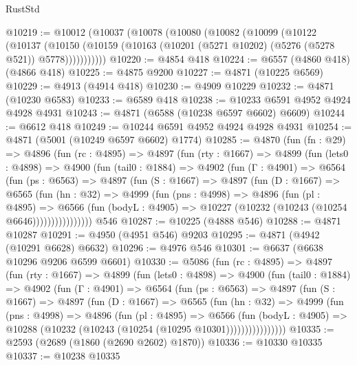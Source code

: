 \begin{lexlean}{RustStd}
\begin{coremodule}
@10219 := @10012
    (@10037
      (@10078
        (@10080
          (@10082
            (@10099
              (@10122
                (@10137
                  (@10150
                    (@10159 (@10163 (@10201 (@5271 @10202) (@5276 (@5278 @521)) @5778)))))))))))
@10220 := @4854 @418
@10224 := @6557 (@4860 @418) (@4866 @418)
@10225 := @4875 @9200
@10227 := @4871 (@10225 @6569)
@10229 := @4913 (@4914 @418)
@10230 := @4909 @10229
@10232 := @4871 (@10230 @6583)
@10233 := @6589 @418
@10238 := @10233 @6591 @4952 @4924 @4928 @4931
@10243 := @4871 (@6588 (@10238 @6597 @6602) @6609)
@10244 := @6612 @418
@10249 := @10244 @6591 @4952 @4924 @4928 @4931
@10254 := @4871 (@5001 (@10249 @6597 @6602) @1774)
@10285 := @4870
    (fun (fn : @29) =>
    @4896
      (fun (rc : @4895) =>
      @4897
        (fun (rty : @1667) =>
        @4899
          (fun (lets0 : @4898) =>
          @4900
            (fun (tail0 : @1884) =>
            @4902
              (fun (Γ : @4901) =>
              @6564
                (fun (ps : @6563) =>
                @4897
                  (fun (S : @1667) =>
                  @4897
                    (fun (D : @1667) =>
                    @6565
                      (fun (hn : @32) =>
                      @4999
                        (fun (pns : @4998) =>
                        @4896
                          (fun (pl : @4895) =>
                          @6566
                            (fun (bodyL : @4905) =>
                            @10227 (@10232 (@10243 (@10254 @6646))))))))))))))))
    @546
@10287 := @10225 (@4888 @546)
@10288 := @4871 @10287
@10291 := @4950 (@4951 @546) @9203
@10295 := @4871 (@4942 (@10291 @6628) @6632)
@10296 := @4976 @546
@10301 := @6637 (@6638 @10296 @9206 @6599 @6601)
@10330 := @5086
    (fun (rc : @4895) =>
    @4897
      (fun (rty : @1667) =>
      @4899
        (fun (lets0 : @4898) =>
        @4900
          (fun (tail0 : @1884) =>
          @4902
            (fun (Γ : @4901) =>
            @6564
              (fun (ps : @6563) =>
              @4897
                (fun (S : @1667) =>
                @4897
                  (fun (D : @1667) =>
                  @6565
                    (fun (hn : @32) =>
                    @4999
                      (fun (pns : @4998) =>
                      @4896
                        (fun (pl : @4895) =>
                        @6566
                          (fun (bodyL : @4905) =>
                          @10288 (@10232 (@10243 (@10254 (@10295 @10301))))))))))))))))
@10335 := @2593 (@2689 (@1860 (@2690 @2602) @1870))
@10336 := @10330 @10335
@10337 := @10238 @10335

\end{coremodule}
\end{lexlean}

